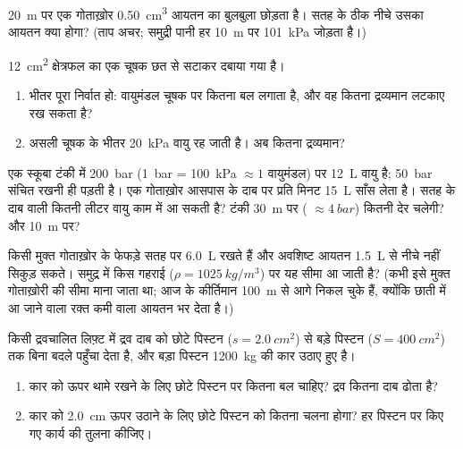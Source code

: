 \begin{exercise}[$\star\star$]\label{exo:g10:pressure:11}
\qty{20}{m} पर एक गोताख़ोर \qty{0.50}{cm^3} आयतन का बुलबुला छोड़ता है। सतह के ठीक
नीचे उसका आयतन क्या होगा? (ताप अचर; समुद्री पानी हर \qty{10}{m} पर \qty{101}{kPa}
जोड़ता है।)
\end{exercise}

\begin{exercise}[$\star\star\star$]\label{exo:g10:pressure:12}
\qty{12}{cm^2} क्षेत्रफल का एक चूषक छत से सटाकर दबाया गया है।
\begin{enumerate}
  \item भीतर पूरा निर्वात हो: वायुमंडल चूषक पर कितना बल लगाता
        है, और वह कितना द्रव्यमान लटकाए रख सकता है?
  \item असली चूषक के भीतर \qty{20}{kPa} वायु रह जाती है। अब कितना द्रव्यमान?
\end{enumerate}
\end{exercise}

\begin{exercise}[$\star\star\star$]\label{exo:g10:pressure:13}
एक स्कूबा टंकी में \qty{200}{bar} (\qty{1}{bar} = \qty{100}{kPa} $\approx 1$ वायुमंडल) पर
\qty{12}{L} वायु है; \qty{50}{bar} संचित रखनी ही पड़ती है। एक गोताख़ोर आसपास के
दाब पर प्रति मिनट \qty{15}{L} साँस लेता है। सतह के दाब
वाली कितनी लीटर वायु काम में आ सकती है? टंकी \qty{30}{m} पर ( $\approx \qty{4}{bar}$) कितनी देर चलेगी? और \qty{10}{m} पर?
\end{exercise}

\begin{exercise}[$\star\star\star$]\label{exo:g10:pressure:14}
किसी मुक्त गोताख़ोर के फेफड़े सतह पर \qty{6.0}{L} रखते हैं और अवशिष्ट आयतन
\qty{1.5}{L} से नीचे नहीं सिकुड़ सकते। समुद्र में किस गहराई ($\rho = \qty{1025}{kg/m^3}$) पर यह
सीमा आ जाती है? (कभी इसे मुक्त गोताख़ोरी की सीमा माना जाता था; आज के
कीर्तिमान \qty{100}{m} से आगे निकल चुके हैं, क्योंकि छाती में आ जाने वाला
रक्त कमी वाला आयतन भर देता है।)
\end{exercise}

\begin{exercise}[$\star\star\star$]\label{exo:g10:pressure:15}
किसी द्रवचालित लिफ़्ट में द्रव दाब को छोटे पिस्टन ($s = \qty{2.0}{cm^2}$) से
बड़े पिस्टन ($S = \qty{400}{cm^2}$) तक बिना बदले पहुँचा देता है, और बड़ा पिस्टन
\qty{1200}{kg} की कार उठाए हुए है।
\begin{enumerate}
  \item कार को ऊपर थामे रखने के लिए छोटे पिस्टन पर कितना बल
        चाहिए? द्रव कितना दाब ढोता है?
  \item कार को \qty{2.0}{cm} ऊपर उठाने के लिए छोटे पिस्टन को कितना चलना
        होगा? हर पिस्टन पर किए गए कार्य की तुलना कीजिए।
\end{enumerate}
\end{exercise}

